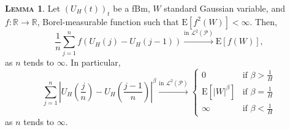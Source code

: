 \documentclass[a4paper, twoside, 11pt]{article}
\theoremstyle{definition}
\newtheorem{lemma}[definition]{\scshape Lemma}
\begin{document}
  \begin{lemma}
	Let $(U_H(t))_{t}$ be a fBm, $W$ standard Gaussian variable, and $f: \mathbb{R}\rightarrow \mathbb{R}$, Borel-measurable function such that $\mathrm{E}[f^2(W)] < \infty$. Then, 
	\begin{equation*}
	  \frac{1}{n}\sum\limits_{j=1}^n f(U_H(j)-U_H(j-1)) \overset{\text{in }\mathcal{L}^2(\mathcal{P})}{\rightarrow} \mathrm{E}[f(W)],
	\end{equation*}
	as $n$ tends to $\infty$. In particular,
	\begin{equation}
	  \sum_{j=1}^n |U_H(\frac{j}{n}) - U_H(\frac{j-1}{n})|^\beta \overset{\text{in }\mathcal{L}^2(\mathcal{P})}{\rightarrow} \begin{cases}
		0 &\mbox{if } \beta > \frac{1}{H}\\
		\mathrm{E}[|W|^\beta] &\mbox{if } \beta = \frac{1}{H}\\
		\infty &\mbox{if } \beta < \frac{1}{H}
	  \end{cases}
	  \label{sec:semilemma}
	\end{equation}
	as $n$ tends to $\infty$.
  \end{lemma}
\end{document}
